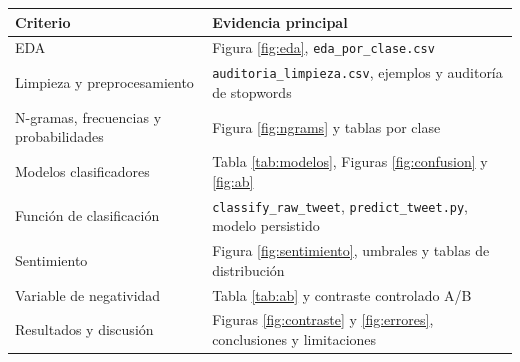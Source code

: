 \documentclass[11pt,letterpaper]{article}
\begin{document}
\begin{longtable}{p{}p{}}
\toprule
\textbf{Criterio} & \textbf{Evidencia principal}\\
\midrule
EDA & Figura \ref{fig:eda}, \texttt{eda\_por\_clase.csv}\\
Limpieza y preprocesamiento & \texttt{auditoria\_limpieza.csv}, ejemplos y auditoría de stopwords\\
N-gramas, frecuencias y probabilidades & Figura \ref{fig:ngrams} y tablas por clase\\
Modelos clasificadores & Tabla \ref{tab:modelos}, Figuras \ref{fig:confusion} y \ref{fig:ab}\\
Función de clasificación & \texttt{classify\_raw\_tweet}, \texttt{predict\_tweet.py}, modelo persistido\\
Sentimiento & Figura \ref{fig:sentimiento}, umbrales y tablas de distribución\\
Variable de negatividad & Tabla \ref{tab:ab} y contraste controlado A/B\\
Resultados y discusión & Figuras \ref{fig:contraste} y \ref{fig:errores}, conclusiones y limitaciones\\
\bottomrule
\end{longtable}
\end{document}
